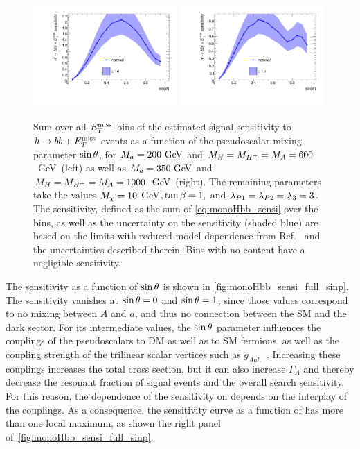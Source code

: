 \begin{figure}[tbp]
\centering
\includegraphics[width=0.49\textwidth]{texinputs/04_grid/figures/monoHbb_sinp_scan_1_sensi_1D.pdf}
\includegraphics[width=0.49\textwidth]{texinputs/04_grid/figures/monoHbb_sinp_scan_2_sensi_1D.pdf}
\caption[Sensitivity to $h\to bb + \MET$ signals with different $\sinp$, summed across $\MET$ bins]
{
Sum over all $\MET$-bins of the estimated signal sensitivity to $h\to bb + \MET$ events as a function of the pseudoscalar mixing parameter $\sinp$, for $M_{a} = 200~\textrm{GeV}$ and $M_{H}=M_{H^{\pm}}=M_{A} = 600$~GeV~(left) as well as $M_{a} = 350~\textrm{GeV}$ and $M_{H}=M_{H^{\pm}}=M_{A} = 1000$~GeV~(right). The remaining parameters take the values
$M_{\chi} = 10 $ GeV$, \tan\beta = 1,$ and $ \lambda_{P1} = \lambda_{P2} = \lambda_{3} = 3 $.
The sensitivity, defined as the sum of \autoref{eq:monoHbb_sensi} over the \met bins, as well as the uncertainty on the sensitivity (shaded blue) 
are based on the limits with reduced model dependence from Ref.~\cite{Aaboud:2017yqz} and the uncertainties described therein. Bins with no content have a negligible sensitivity.
}
\label{fig:monoHbb_sensi_full_sinp}
\end{figure}

The sensitivity as a function of $\sinp$ is shown in \autoref{fig:monoHbb_sensi_full_sinp}.
The sensitivity vanishes at $\sin\theta=0$ and $\sin\theta=1$, since those values correspond to no mixing between $A$ and $a$, and thus no connection between the SM and the dark sector. 
For its intermediate values, the $\sinp$ parameter influences the couplings of the pseudoscalars to DM as well as to SM fermions, as well as the coupling strength of the trilinear scalar vertices such as $g_{Aah}$~\cite{Bauer:2017ota}. 
Increasing these couplings increases the total cross section, but it can also increase $\Gamma_A$ and thereby decrease the resonant fraction of signal events and the overall search sensitivity.
For this reason, the dependence of the sensitivity on \sinp depends on the interplay of the couplings.
As a consequence, the sensitivity curve as a function of \sinp has more than one local maximum, as shown the right panel of~\autoref{fig:monoHbb_sensi_full_sinp}. 

